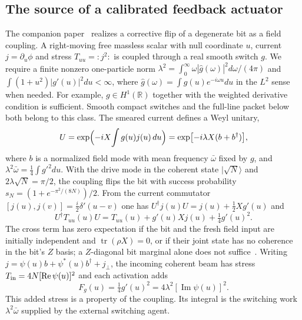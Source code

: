 \subsection{The source of a calibrated feedback actuator}
\label{sec:actuator-source}

The companion paper~\cite{Liu2026QRAIFB} realizes a corrective flip of a degenerate bit as a field coupling. A right-moving free massless scalar with null coordinate $u$, current $j=\partial_u\phi$ and stress $T_{uu}=:j^2:$ is coupled through a real smooth switch $g$. We require a finite nonzero one-particle norm
$\lambda^2=\int_0^\infty\omega|\hat g(\omega)|^2d\omega/(4\pi)$ and
$\int(1+u^2)|g'(u)|^2du<\infty$, where
$\hat g(\omega)=\int g(u)e^{-i\omega u}du$ in the $L^2$ sense when needed.
For example, $g\in H^1(\mathbb R)$ together with the weighted derivative condition
is sufficient. Smooth compact switches and the full-line packet below both belong
to this class. The smeared current defines a Weyl unitary,
\begin{equation}
U=\exp\Bigl(-iX\!\int g(u)j(u)\,du\Bigr)=\exp[-i\lambda X(b+b^\dagger)],
\end{equation}
where $b$ is a normalized field mode with mean frequency $\bar\omega$ fixed by $g$, and $\lambda^2\bar\omega=\tfrac14\int g'^2du$. With the drive mode in the coherent state $|\sqrt N\rangle$ and $2\lambda\sqrt N=\pi/2$, the coupling flips the bit with success probability $s_N=(1+e^{-\pi^2/(8N)})/2$. From the current commutator $[j(u),j(v)]=\tfrac i2\delta'(u-v)$ one has $U^\dagger j(u)U=j(u)+\tfrac12Xg'(u)$ and
\begin{equation}
U^\dagger T_{uu}(u)U=T_{uu}(u)+g'(u)Xj(u)+\tfrac14g'(u)^2 .
\label{eq:stress-id}
\end{equation}
The cross term has zero expectation if the bit and the fresh field input are initially independent and $\operatorname{tr}(\rho X)=0$, or if their joint state has no coherence in the bit's $Z$ basis; a $Z$-diagonal bit marginal alone does not suffice~\cite{Liu2026QRAIFB}. Writing $j=\psi(u)b+\psi^*(u)b^\dagger+j_\perp$, the incoming coherent beam has stress $T_{\rm in}=4N[\operatorname{Re}\psi(u)]^2$ and each activation adds
\begin{equation}
F_g(u)=\tfrac14g'(u)^2=4\lambda^2[\operatorname{Im}\psi(u)]^2 .
\label{eq:Fg}
\end{equation}
This added stress is a property of the coupling. Its integral is the switching work $\lambda^2\bar\omega$ supplied by the external switching agent.

